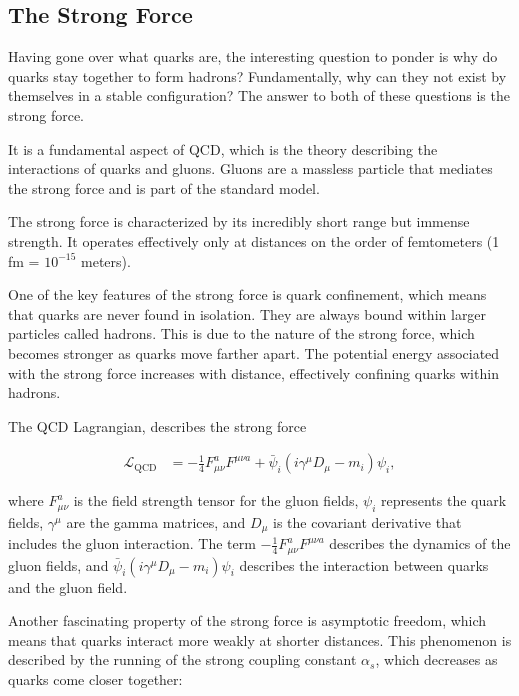 \subsection{The Strong Force}

Having gone over what quarks are, the interesting question to ponder is why do quarks stay together to form hadrons?
Fundamentally, why can they not exist by themselves in a stable configuration?
The answer to both of these questions is the strong force.

It is a fundamental aspect of QCD, which is the theory describing the interactions of quarks and gluons.
Gluons are a massless particle that mediates the strong force and is part of the standard model.

The strong force is characterized by its incredibly short range but immense strength.
It operates effectively only at distances on the order of femtometers (1 fm = \(10^{-15}\) meters).

One of the key features of the strong force is quark confinement, which means that quarks are never found in isolation.
They are always bound within larger particles called hadrons.
This is due to the nature of the strong force, which becomes stronger as quarks move farther apart.
The potential energy associated with the strong force increases with distance, effectively confining quarks within hadrons.

The QCD Lagrangian, describes the strong force

\begin{align}
  \mathcal{L}_{\text{QCD}} &= -\frac{1}{4} F_{\mu\nu}^a F^{\mu\nu a} + \bar{\psi}_i (i \gamma^\mu D_\mu - m_i) \psi_i,
\end{align}

where \( F_{\mu\nu}^a \) is the field strength tensor for the gluon fields, \( \psi_i \) represents the quark fields, \( \gamma^\mu \) are the gamma matrices, and \( D_\mu \) is the covariant derivative that includes the gluon interaction.
The term \( -\frac{1}{4} F_{\mu\nu}^a F^{\mu\nu a} \) describes the dynamics of the gluon fields, and \( \bar{\psi}_i (i \gamma^\mu D_\mu - m_i) \psi_i \) describes the interaction between quarks and the gluon field.

Another fascinating property of the strong force is asymptotic freedom, which means that quarks interact more weakly at shorter distances.
This phenomenon is described by the running of the strong coupling constant \( \alpha_s \), which decreases as quarks come closer together:

